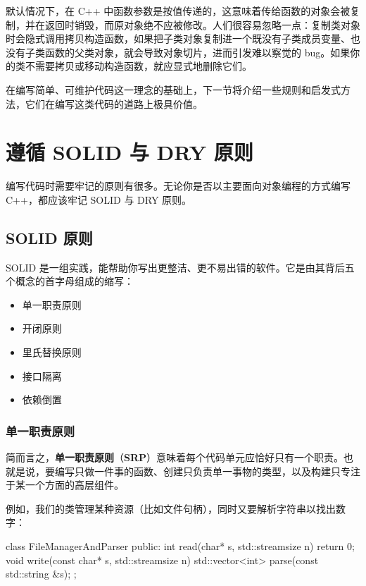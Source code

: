 默认情况下，在 C++ 中函数参数是按值传递的，这意味着传给函数的对象会被复制，并在返回时销毁，而原对象绝不应被修改。人们很容易忽略一点：复制类对象时会隐式调用拷贝构造函数，如果把子类对象复制进一个既没有子类成员变量、也没有子类函数的父类对象，就会导致对象切片，进而引发难以察觉的 bug。如果你的类不需要拷贝或移动构造函数，就应显式地删除它们。

\label{idx:032}
在编写简单、可维护代码这一理念的基础上，下一节将介绍一些规则和启发式方法，它们在编写这类代码的道路上极具价值。

\section{遵循 SOLID 与 DRY 原则}

编写代码时需要牢记的原则有很多。无论你是否以主要面向对象编程的方式编写 C++，都应该牢记 SOLID 与 DRY 原则。

\subsection{SOLID 原则}

\label{idx:033}
SOLID 是一组实践，能帮助你写出更整洁、更不易出错的软件。它是由其背后五个概念的首字母组成的缩写：

\begin{itemize}
\item 单一职责原则
\item 开闭原则
\item 里氏替换原则
\item 接口隔离
\item 依赖倒置
\end{itemize}

\subsubsection{单一职责原则}

\label{idx:034}
\label{idx:035}
简而言之，\textbf{单一职责原则}（\textbf{SRP}）意味着每个代码单元应恰好只有一个职责。也就是说，要编写只做一件事的函数、创建只负责单一事物的类型，以及构建只专注于某一个方面的高层组件。

例如，我们的类管理某种资源（比如文件句柄），同时又要解析字符串以找出数字：

\begin{codebox}[cpp]
class FileManagerAndParser {
public:
    int read(char* s, std::streamsize n) { return 0; }
    void write(const char* s, std::streamsize n) {}
    std::vector<int> parse(const std::string &s);
};
\end{codebox}

